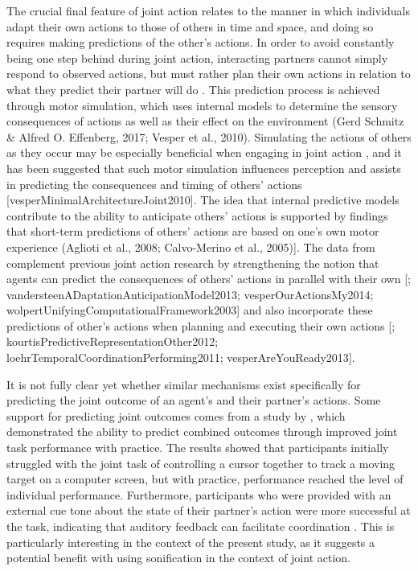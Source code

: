 \documentclass[10pt,a4paper,onecolumn]{article}
\begin{document}
The crucial final feature of joint action relates to the manner in which individuals adapt their own actions to those of others in time and space, and doing so requires making predictions of the other's actions. In order to avoid constantly being one step behind during joint action, interacting partners cannot simply respond to observed actions, but must rather plan their own actions in relation to what they predict their partner will do \autocite{sebanzJointActionBodies2006}. This prediction process is achieved through motor simulation, which uses internal models to determine the sensory consequences of actions as well as their effect on the environment (Gerd Schmitz \& Alfred O. Effenberg, 2017; Vesper et al., 2010). Simulating the actions of others as they occur may be especially beneficial when engaging in joint action , and it has been suggested that such motor simulation influences perception and assists in predicting the consequences and timing of others' actions {[}vesperMinimalArchitectureJoint2010{]}. The idea that internal predictive models contribute to the ability to anticipate others' actions is supported by findings that short-term predictions of others' actions are based on one's own motor experience (Aglioti et al., 2008; Calvo-Merino et al., 2005){]}. The data from \textcite{loehrSoundYouMe2016} complement previous joint action research by strengthening the notion that agents can predict the consequences of others' actions in parallel with their own {[}\textcite{loehrMonitoringIndividualJoint2013}; vandersteenADaptationAnticipationModel2013; vesperOurActionsMy2014; wolpertUnifyingComputationalFramework2003{]} and also incorporate these predictions of other's actions when planning and executing their own actions {[}\textcite{knoblichActionCoordinationGroups2003}; kourtisPredictiveRepresentationOther2012; loehrTemporalCoordinationPerforming2011; vesperAreYouReady2013{]}.

It is not fully clear yet whether similar mechanisms exist specifically for predicting the joint outcome of an agent's and their partner's actions. Some support for predicting joint outcomes comes from a study by \textcite{knoblichActionCoordinationGroups2003}, which demonstrated the ability to predict combined outcomes through improved joint task performance with practice. The results showed that participants initially struggled with the joint task of controlling a cursor together to track a moving target on a computer screen, but with practice, performance reached the level of individual performance. Furthermore, participants who were provided with an external cue tone about the state of their partner's action were more successful at the task, indicating that auditory feedback can facilitate coordination \autocite{knoblichActionCoordinationGroups2003}. This is particularly interesting in the context of the present study, as it suggests a potential benefit with using sonification in the context of joint action.
\end{document}
